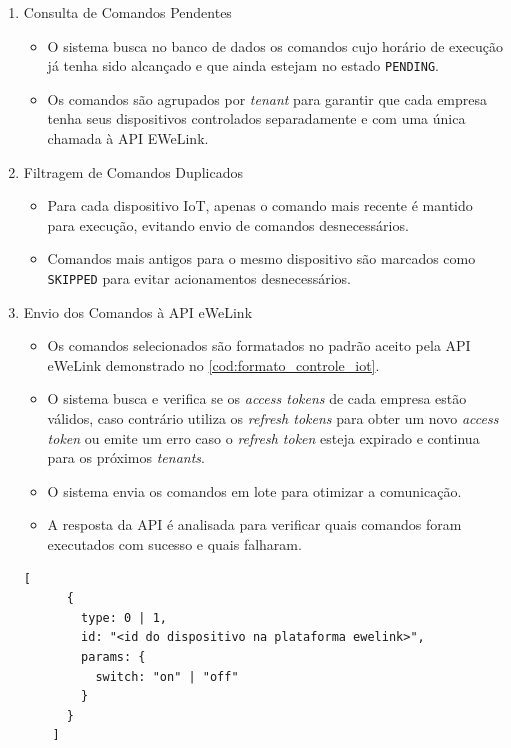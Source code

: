 \begin{enumerate}
  \item Consulta de Comandos Pendentes
  \begin{itemize}
      \item O sistema busca no banco de dados os comandos cujo horário de execução já tenha sido alcançado e que ainda estejam no estado \texttt{PENDING}.
      \item Os comandos são agrupados por \textit{tenant} para garantir que cada empresa tenha seus dispositivos controlados separadamente e com uma única chamada à API EWeLink.
  \end{itemize}
  
  \item Filtragem de Comandos Duplicados
  \begin{itemize}
      \item Para cada dispositivo IoT, apenas o comando mais recente é mantido para execução, evitando envio de comandos desnecessários.
      \item Comandos mais antigos para o mesmo dispositivo são marcados como \texttt{SKIPPED} para evitar acionamentos desnecessários.
  \end{itemize}
  
  \item Envio dos Comandos à API eWeLink
  \begin{itemize}
      \item Os comandos selecionados são formatados no padrão aceito pela API eWeLink demonstrado no \autoref{cod:formato_controle_iot}.
      \item O sistema busca e verifica se os \textit{access tokens} de cada empresa estão válidos, caso contrário utiliza os \textit{refresh tokens} para obter um novo \textit{access token} ou emite um erro caso o \textit{refresh token} esteja expirado e continua para os próximos \textit{tenants}.
      \item O sistema envia os comandos em lote para otimizar a comunicação.
      \item A resposta da API é analisada para verificar quais comandos foram executados com sucesso e quais falharam.
  \end{itemize}

  \begin{lstlisting}[caption={Formato de envio de comando para \acrshort{API}.},label={cod:formato_controle_iot}]
    [
      {
        type: 0 | 1,
        id: "<id do dispositivo na plataforma ewelink>",
        params: {
          switch: "on" | "off"
        }
      }
    ]
  \end{lstlisting}


\end{enumerate}
